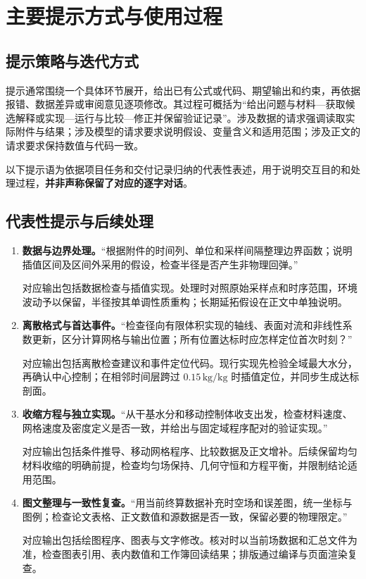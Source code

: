 \documentclass[UTF8,a4paper,12pt,fontset=windows]{ctexart}
\begin{document}
\newpage
\section{主要提示方式与使用过程}
\subsection{提示策略与迭代方式}
提示通常围绕一个具体环节展开，给出已有公式或代码、期望输出和约束，再依据报错、数据差异或审阅意见逐项修改。其过程可概括为“给出问题与材料---获取候选解释或实现---运行与比较---修正并保留验证记录”。涉及数据的请求强调读取实际附件与结果；涉及模型的请求要求说明假设、变量含义和适用范围；涉及正文的请求要求保持数值与代码一致。

以下提示语为依据项目任务和交付记录归纳的代表性表述，用于说明交互目的和处理过程，\textbf{并非声称保留了对应的逐字对话}。

\subsection{代表性提示与后续处理}
\begin{enumerate}[label=\textbf{（\arabic*）},leftmargin=2.6em]
  \item \textbf{数据与边界处理。}“根据附件的时间列、单位和采样间隔整理边界函数；说明插值区间及区间外采用的假设，检查半径是否产生非物理回弹。”

  对应输出包括数据检查与插值实现。处理时对照原始采样点和时序范围，环境波动予以保留，半径按其单调性质重构；长期延拓假设在正文中单独说明。

  \item \textbf{离散格式与首达事件。}“检查径向有限体积实现的轴线、表面对流和非线性系数更新，区分计算网格与输出位置；所有位置达标时应怎样定位首次时刻？”

  对应输出包括离散检查建议和事件定位代码。现行实现先检验全域最大水分，再确认中心控制；在相邻时间层跨过 $0.15\,\mathrm{kg/kg}$ 时插值定位，并同步生成达标剖面。

  \item \textbf{收缩方程与独立实现。}“从干基水分和移动控制体收支出发，检查材料速度、网格速度及密度定义是否一致，并给出与固定域程序配对的验证实现。”

  对应输出包括条件推导、移动网格程序、比较数据及正文增补。后续保留均匀材料收缩的明确前提，检查均匀场保持、几何守恒和方程平衡，并限制结论适用范围。

  \item \textbf{图文整理与一致性复查。}“用当前终算数据补充时空场和误差图，统一坐标与图例；检查论文表格、正文数值和源数据是否一致，保留必要的物理限定。”

  对应输出包括绘图程序、图表与文字修改。核对时以当前场数据和汇总文件为准，检查图表引用、表内数值和工作簿回读结果；排版通过编译与页面渲染复查。
\end{enumerate}
\end{document}
